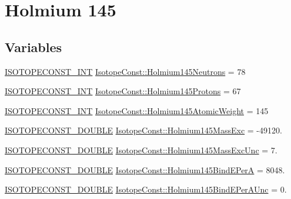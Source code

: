 \hypertarget{group___isotope_const-_holmium-_ho145}{}\section{Holmium 145}
\label{group___isotope_const-_holmium-_ho145}
\subsection*{Variables}
\begin{DoxyCompactItemize}
\item 
\mbox{\hyperlink{group___isotope_const-_macros_ga5f18360b3e99483a35c32d789e62621c}{I\+S\+O\+T\+O\+P\+E\+C\+O\+N\+S\+T\+\_\+\+I\+NT}} \mbox{\hyperlink{group___isotope_const-_holmium-_ho145_ga1568bc480cab5cd8975ada7a61612e7b}{Isotope\+Const\+::\+Holmium145\+Neutrons}} = 78
\item 
\mbox{\hyperlink{group___isotope_const-_macros_ga5f18360b3e99483a35c32d789e62621c}{I\+S\+O\+T\+O\+P\+E\+C\+O\+N\+S\+T\+\_\+\+I\+NT}} \mbox{\hyperlink{group___isotope_const-_holmium-_ho145_ga9afe1a32db2c78e61bd8dcf2673498d0}{Isotope\+Const\+::\+Holmium145\+Protons}} = 67
\item 
\mbox{\hyperlink{group___isotope_const-_macros_ga5f18360b3e99483a35c32d789e62621c}{I\+S\+O\+T\+O\+P\+E\+C\+O\+N\+S\+T\+\_\+\+I\+NT}} \mbox{\hyperlink{group___isotope_const-_holmium-_ho145_gabc1a2b2cc215fff3c84936d17f55c670}{Isotope\+Const\+::\+Holmium145\+Atomic\+Weight}} = 145
\item 
\mbox{\hyperlink{group___isotope_const-_macros_ga8f45a7272ce02c0b4c65c44636ed719a}{I\+S\+O\+T\+O\+P\+E\+C\+O\+N\+S\+T\+\_\+\+D\+O\+U\+B\+LE}} \mbox{\hyperlink{group___isotope_const-_holmium-_ho145_ga00dd8fb043698d99d8bc10357722731a}{Isotope\+Const\+::\+Holmium145\+Mass\+Exc}} = -\/49120.
\item 
\mbox{\hyperlink{group___isotope_const-_macros_ga8f45a7272ce02c0b4c65c44636ed719a}{I\+S\+O\+T\+O\+P\+E\+C\+O\+N\+S\+T\+\_\+\+D\+O\+U\+B\+LE}} \mbox{\hyperlink{group___isotope_const-_holmium-_ho145_gabb064d8774e4f59f4183df532a191fa8}{Isotope\+Const\+::\+Holmium145\+Mass\+Exc\+Unc}} = 7.
\item 
\mbox{\hyperlink{group___isotope_const-_macros_ga8f45a7272ce02c0b4c65c44636ed719a}{I\+S\+O\+T\+O\+P\+E\+C\+O\+N\+S\+T\+\_\+\+D\+O\+U\+B\+LE}} \mbox{\hyperlink{group___isotope_const-_holmium-_ho145_gafcea964acbd088085fbaf5d2bbac22d5}{Isotope\+Const\+::\+Holmium145\+Bind\+E\+PerA}} = 8048.
\item 
\mbox{\hyperlink{group___isotope_const-_macros_ga8f45a7272ce02c0b4c65c44636ed719a}{I\+S\+O\+T\+O\+P\+E\+C\+O\+N\+S\+T\+\_\+\+D\+O\+U\+B\+LE}} \mbox{\hyperlink{group___isotope_const-_holmium-_ho145_ga89c352fce75d3195f56aa4d568b5cb88}{Isotope\+Const\+::\+Holmium145\+Bind\+E\+Per\+A\+Unc}} = 0.

\end{DoxyCompactItemize}
